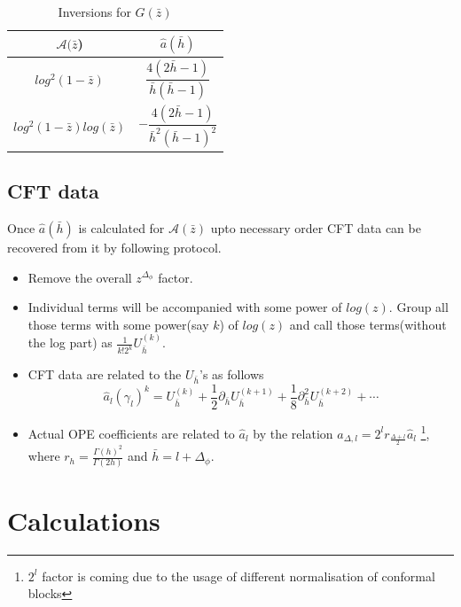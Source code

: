 \documentclass[12pt,a4paper,oneside]{book}
\theoremstyle{definition}
\begin{document}
        \begin{table}[h]
        \begin{center}
        \begin{tabular}{c|c}
            
            $\mathcal{A}(\bar{z}$) & $\hat{a}(\bar{h})$\\
            \hline\hline
            $log^2(1-\bar{z})$ & $\dfrac{4(2\bar{h}-1)}{\bar{h}(\bar{h}-1)}$\\
            $log^2(1-\bar{z})log(\bar{z})$ & $-\dfrac{4(2\bar{h}-1)}{\bar{h}^2(\bar{h}-1)^2}$\\
        \end{tabular} 
        \end{center}
        \caption{Inversions for $G(\bar{z})$}
        \end{table}
    \subsection{CFT data}
        Once $\hat{a}(\bar{h})$ is calculated for $\mathcal{A}(\bar{z})$ upto necessary order CFT data can be recovered from it by following protocol.
        \begin{itemize}
        \item Remove the overall $z^{\Delta_{\phi}}$ factor.
        \item Individual terms will be accompanied with some power of $log(z)$. Group all those terms with some power(say $k$) of $log(z)$ and call those terms(without the log part) as $\frac{1}{k!2^k}U_{\bar{h}}^{(k)}$.
        \item CFT data are related to the $U_{\bar{h}}$'s as follows
                    \begin{equation}
                        \hat{a}_l(\gamma_l)^k = U_{\bar{h}}^{(k)} + \frac{1}{2}\partial_{\bar{h}}U_{\bar{h}}^{(k+1)} + \frac{1}{8}\partial_{\bar{h}}^2U_{\bar{h}}^{(k+2)} + \cdots
                    \end{equation}
                \item Actual OPE coefficients are related to $\hat{a}_l$ by the relation $a_{\Delta,l} = 2^lr_{\frac{\Delta+l}{2}}\hat{a}_l$ \footnote{$2^l$ factor is coming due to the usage of different normalisation of conformal blocks}, where $r_h = \frac{\Gamma(h)^2}{\Gamma(2h)}$ and $\bar{h} = l+ \Delta_{\phi}$.
            \end{itemize}
    \section{Calculations}
\end{document}

